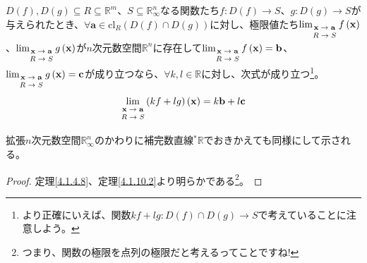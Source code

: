 \documentclass[dvipdfmx]{jsarticle}
\begin{document}
\begin{thm}\label{4.1.10.9}
$D(f),D(g) \subseteq R \subseteq \mathbb{R}^{m}$、$S \subseteq \mathbb{R}_{\infty}^{n}$なる関数たち$f:D(f) \rightarrow S$、$g:D(g) \rightarrow S$が与えられたとき、$\forall\mathbf{a} \in \mathrm{cl}_{R}\left( D(f) \cap D(g) \right)$に対し、極限値たち$\lim_{\scriptsize \begin{matrix} \mathbf{x} \rightarrow \mathbf{a} \\ R \rightarrow S \\\end{matrix}}{f\left( \mathbf{x} \right)}$、$\lim_{\scriptsize \begin{matrix} \mathbf{x} \rightarrow \mathbf{a} \\ R \rightarrow S \\\end{matrix}}{g\left( \mathbf{x} \right)}$が$n$次元数空間$\mathbb{R}^{n}$に存在して$\lim_{\scriptsize \begin{matrix} \mathbf{x} \rightarrow \mathbf{a} \\ R \rightarrow S \\\end{matrix}}{f\left( \mathbf{x} \right)} = \mathbf{b}$、$\lim_{\scriptsize \begin{matrix} \mathbf{x} \rightarrow \mathbf{a} \\ R \rightarrow S \\\end{matrix}}{g\left( \mathbf{x} \right)} = \mathbf{c}$が成り立つなら、$\forall k,l \in \mathbb{R}$に対し、次式が成り立つ\footnote{より正確にいえば、関数$kf + lg:D(f) \cap D(g) \rightarrow S$で考えていることに注意しよう。}。
\begin{align*}
\lim_{\scriptsize \begin{matrix} \mathbf{x} \rightarrow \mathbf{a} \\ R \rightarrow S \\\end{matrix}}{(kf + lg)\left( \mathbf{x} \right)} = k\mathbf{b} + l\mathbf{c}
\end{align*}\par
拡張$n$次元数空間$\mathbb{R}_{\infty}^{n}$のかわりに補完数直線${}^{*}\mathbb{R}$でおきかえても同様にして示される。
\end{thm}
\begin{proof} 定理\ref{4.1.4.8}、定理\ref{4.1.10.2}より明らかである\footnote{つまり、関数の極限を点列の極限だと考えるってことですね! }。
\end{proof}
\end{document}

